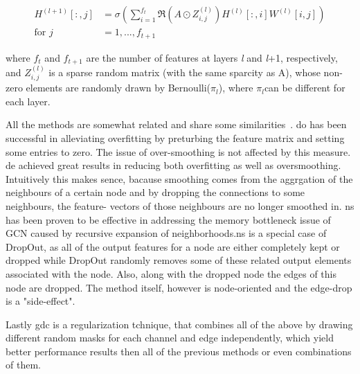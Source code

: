 \begin{align*}
    H^{(l+1)}[:,j] & = \sigma \left(\sum_{i=1}^{f_{t}}\mathfrak{R}\left(A \odot Z_{i,j}^{(l)}\right)H^{(l)}[:,i]W^{(l)}[i,j]\right) \\
    \text{for } j  & = 1,..., f_{t+1}
\end{align*}

where $f_{t}$ and $f_{t+1}$ are the number of features at layers \textit{l} and \textit{l}+1, respectively, and
$Z_{i,j}^{(l)}$ is a sparse random matrix (with the same sparcity as A), whose non-zero
elements are randomly drawn by Bernoulli($\pi_{l}$), where $\pi_{l}$can be different for each layer.


All the methods are somewhat related and share some similarities~\cite{Rong2020}.
\acf{do} has been successful in alleviating overfitting by preturbing the feature matrix and setting some entries to zero. The issue of over-smoothing is not affected by this measure.
\acf{de} achieved great results in reducing both overfitting as well as oversmoothing. Intuitively this makes sence, bacause smoothing comes from the aggrgation of the neighbours of a certain node and by dropping the connections to some neighbours, the feature- vectors of those neighbours are no longer smoothed in.
\ac{ns} has been proven to be effective in addressing the memory bottleneck issue of GCN caused by recursive expansion of neighborhoods.\ac{ns} is a special case of DropOut, as all of the output features for a node are either completely kept or dropped while DropOut randomly removes some of these related output elements associated with the node. Also, along with the dropped node the edges of this node are dropped. The method itself, however is node-oriented and the edge-drop is a "side-effect".

Lastly \ac{gdc} is a regularization tchnique, that combines all of the above by drawing different random masks for each channel and edge independently, which yield better performance results then all of the previous methods or even combinations of them.
